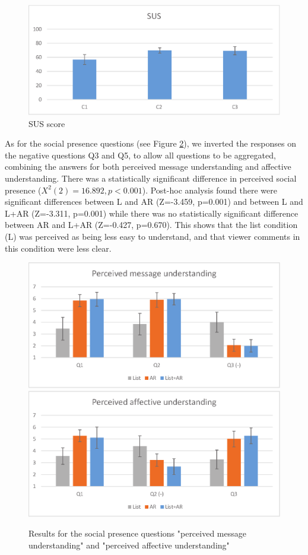 \begin{figure}[ht]
  \centering
  \includegraphics[width=.8\linewidth]{images/mgia16/sus.eps}
  \caption{SUS score}
  \label{fig:mgia16:questions_sus}
\end{figure}

As for the social presence questions (see Figure \ref{fig:mgia16:social_presence}), we inverted the responses on the negative questions Q3 and Q5, to allow all questions to be aggregated, combining the answers for both perceived message understanding and affective understanding. There was a statistically significant difference in perceived social presence ($X^2(2)=16.892, p<0.001$). Post-hoc analysis found there were significant differences between L and AR (Z=-3.459, p=0.001) and between L and L+AR (Z=-3.311, p=0.001) while there was no statistically significant difference between AR and L+AR (Z=-0.427, p=0.670). This shows that the list condition (L) was perceived as being less easy to understand, and that viewer comments in this condition were less clear.

\begin{figure}[ht]
  \centering
  \includegraphics[width=.8\linewidth]{images/mgia16/message.eps}
  \includegraphics[width=.8\linewidth]{images/mgia16/affective.eps}
  \caption{Results for the social presence questions "perceived message understanding" and "perceived affective understanding"}
	\label{fig:mgia16:social_presence}
\end{figure}

